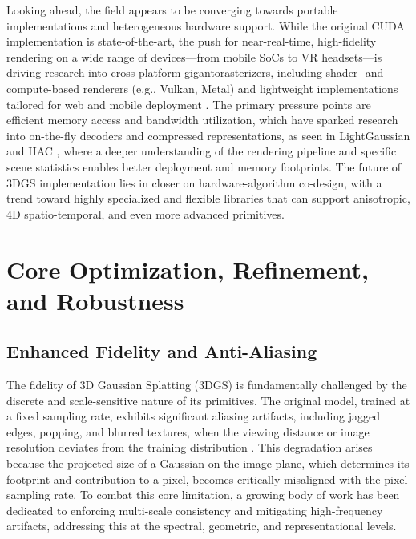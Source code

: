 \documentclass[11pt,a4paper]{article}
\begin{document}
Looking ahead, the field appears to be converging towards portable implementations and heterogeneous hardware support. While the original CUDA implementation is state-of-the-art, the push for near-real-time, high-fidelity rendering on a wide range of devices---from mobile SoCs to VR headsets---is driving research into cross-platform gigantorasterizers, including shader- and compute-based renderers (e.g., Vulkan, Metal) and lightweight implementations tailored for web and mobile deployment \cite{arxiv:2401.06003v2}. The primary pressure points are efficient memory access and bandwidth utilization, which have sparked research into on-the-fly decoders and compressed representations, as seen in LightGaussian \cite{arxiv:2311.17245v5} and HAC \cite{arxiv:2403.14530v2}, where a deeper understanding of the rendering pipeline and specific scene statistics enables better deployment and memory footprints. The future of 3DGS implementation lies in closer on hardware-algorithm co-design, with a trend toward highly specialized and flexible libraries that can support anisotropic, 4D spatio-temporal, and even more advanced primitives.


\section{Core Optimization, Refinement, and Robustness}



\subsection{Enhanced Fidelity and Anti-Aliasing}


The fidelity of 3D Gaussian Splatting (3DGS) is fundamentally challenged by the discrete and scale-sensitive nature of its primitives. The original model, trained at a fixed sampling rate, exhibits significant aliasing artifacts, including jagged edges, popping, and blurred textures, when the viewing distance or image resolution deviates from the training distribution \cite{arxiv:2308.04079v1}. This degradation arises because the projected size of a Gaussian on the image plane, which determines its footprint and contribution to a pixel, becomes critically misaligned with the pixel sampling rate. To combat this core limitation, a growing body of work has been dedicated to enforcing multi-scale consistency and mitigating high-frequency artifacts, addressing this at the spectral, geometric, and representational levels.
\end{document}
